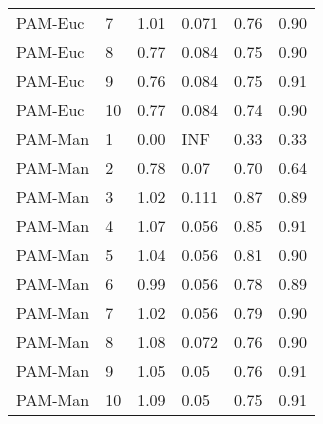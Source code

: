 \begin{table}[ht]
\begin{tabular}{llrlrr}
  PAM-Euc & 7 & 1.01 & 0.071 & 0.76 & 0.90 \\ 
  PAM-Euc & 8 & 0.77 & 0.084 & 0.75 & 0.90 \\ 
  PAM-Euc & 9 & 0.76 & 0.084 & 0.75 & 0.91 \\ 
  PAM-Euc & 10 & 0.77 & 0.084 & 0.74 & 0.90 \\ 
  PAM-Man & 1 & 0.00 & INF & 0.33 & 0.33 \\ 
  PAM-Man & 2 & 0.78 & 0.07 & 0.70 & 0.64 \\ 
  PAM-Man & 3 & 1.02 & 0.111 & 0.87 & 0.89 \\ 
  PAM-Man & 4 & 1.07 & 0.056 & 0.85 & 0.91 \\ 
  PAM-Man & 5 & 1.04 & 0.056 & 0.81 & 0.90 \\ 
  PAM-Man & 6 & 0.99 & 0.056 & 0.78 & 0.89 \\ 
  PAM-Man & 7 & 1.02 & 0.056 & 0.79 & 0.90 \\ 
  PAM-Man & 8 & 1.08 & 0.072 & 0.76 & 0.90 \\ 
  PAM-Man & 9 & 1.05 & 0.05 & 0.76 & 0.91 \\ 
  PAM-Man & 10 & 1.09 & 0.05 & 0.75 & 0.91 \\ 
   \hline
\end{tabular}
\end{table}
